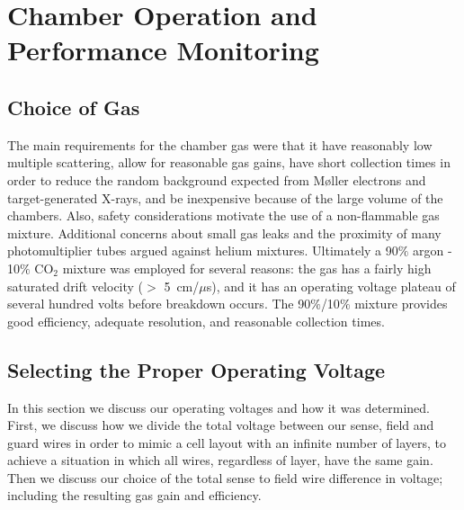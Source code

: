 \section{Chamber Operation and Performance Monitoring}

\subsection{Choice of Gas}

The main requirements for the chamber gas were that it have reasonably low 
multiple scattering, allow for reasonable gas gains, have short collection 
times in order to reduce the random background expected from M{\o}ller 
electrons and target-generated X-rays, and be inexpensive because of the 
large volume of the chambers. Also, safety considerations motivate the use of
a non-flammable gas mixture.  Additional concerns about small gas 
leaks and the proximity of many photomultiplier tubes argued against helium 
mixtures.  Ultimately a 90$\%$ argon - 10$\%$ CO$_2$ mixture was employed 
for several reasons: the gas has a fairly high saturated drift velocity 
($>$ 5~cm/$\mu$s), and it has an operating voltage plateau of several hundred 
volts before breakdown occurs.  The 90$\%$/10$\%$ mixture 
provides good efficiency, adequate resolution, and reasonable collection times.




\subsection{Selecting the Proper Operating Voltage}

In this section we discuss our operating voltages and how it was determined.
First, we discuss how we divide the total voltage between our sense, field 
and guard wires in order to mimic a cell layout with an infinite number of
layers, to achieve a situation in which all wires, regardless of layer, have
the same gain.  Then we discuss our choice of the total sense to field
wire difference in voltage; including the resulting gas gain and efficiency.


